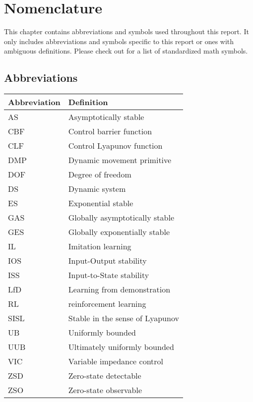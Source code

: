\chapter*{Nomenclature}

This chapter contains abbreviations and symbols used throughout this report. It only includes abbreviations and symbols specific to this report or ones with ambiguous definitions. Please check out \cite{ListMathematicalSymbols2022} for a list of standardized math symbols.

\section*{Abbreviations}

\begin{longtable}{p{2.5cm}p{8cm}}
    \toprule
    Abbreviation & Definition                      \\
    \midrule\endhead %
    AS           & Asymptotically stable           \\
    CBF          & Control barrier function        \\
    CLF          & Control Lyapunov function       \\
    DMP          & Dynamic movement primitive      \\
    DOF          & Degree of freedom               \\
    DS           & Dynamic system                  \\   
    ES           & Exponential stable              \\
    GAS          & Globally asymptotically stable  \\
    GES          & Globally exponentially  stable  \\
    IL           & Imitation learning              \\
    IOS          & Input-Output stability          \\
    ISS          & Input-to-State stability        \\
    LfD          & Learning from demonstration     \\
    RL           & reinforcement learning          \\
    SISL         & Stable in the sense of Lyapunov \\
    UB           & Uniformly bounded               \\
    UUB          & Ultimately uniformly bounded    \\
    VIC          & Variable impedance control      \\
    ZSD          & Zero-state detectable           \\
    ZSO          & Zero-state observable           \\
    \bottomrule
\end{longtable}

